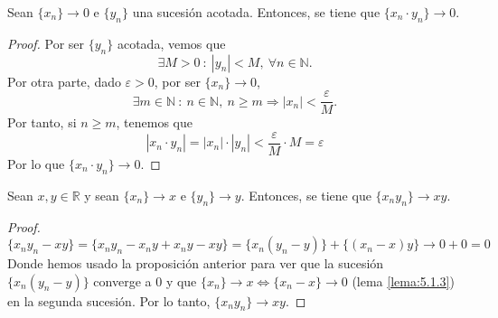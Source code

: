 \begin{prop}\label{prop:5.3.2}
    Sean $\{x_n\} \longrightarrow 0$ e $\{y_n\}$ una sucesión acotada. Entonces, se tiene que $\{x_n \cdot y_n\} \longrightarrow 0$.
\end{prop}
\begin{proof}
    Por ser $\{y_n\}$ acotada, vemos que
    \begin{equation*}
        \exists M > 0 ~:~ |y_n| < M, ~ \forall n \in \mathbb{N}.
    \end{equation*}
    Por otra parte, dado $\varepsilon > 0$, por ser $\{x_n\} \longrightarrow 0$,
    \begin{equation*}
        \exists m \in \mathbb{N} ~:~ n \in \mathbb{N},~ n \geq m \Longrightarrow |x_n| < \frac{\varepsilon}{M}.
    \end{equation*}
    Por tanto, si $ n \geq m$, tenemos que
    \begin{equation*}
        | x_n \cdot y_n | = |x_n| \cdot |y_n| < \frac{\varepsilon}{M} \cdot M = \varepsilon
    \end{equation*}
    Por lo que $\{x_n \cdot y_n\} \longrightarrow 0$.
\end{proof}

\begin{prop}\label{prop:5.3.3}
    Sean $x,y \in \mathbb{R}$ y sean $\{x_n\} \longrightarrow x$ e $\{y_n\} \longrightarrow y$. Entonces, se tiene que $\{x_n y_n\} \longrightarrow x y$.
\end{prop}
\begin{proof}
    \begin{equation*}
    \{x_n y_n - xy\} = \{x_n y_n -x_n y + x_n y - x y\} = \{x_n(y_n - y)\} + \{(x_n-x)y\} \longrightarrow 0 + 0 = 0
    \end{equation*}
    Donde hemos usado la proposición anterior para ver que la sucesión $\{x_n(y_n - y)\}$ converge a $0$
    y que $\{ x_n \} \longrightarrow x \Longleftrightarrow \{ x_n -x\} \longrightarrow 0$ (lema \ref{lema:5.1.3}) en la segunda sucesión.
    \newline
    \newline
    Por lo tanto, $\{x_n y_n\} \longrightarrow x y$.
\end{proof}

